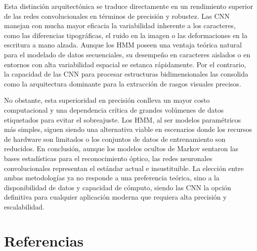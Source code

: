 \documentclass[
  spanish,
  us-letterpaper,
  DIV=11,
  numbers=noendperiod]{scrreprt}
\begin{document}
Esta distinción arquitectónica se traduce directamente en un rendimiento
superior de las redes convolucionales en términos de precisión y
robustez. Las CNN manejan con mucha mayor eficacia la variabilidad
inherente a los caracteres, como las diferencias tipográficas, el ruido
en la imagen o las deformaciones en la escritura a mano alzada. Aunque
los HMM poseen una ventaja teórica natural para el modelado de datos
secuenciales, su desempeño en caracteres aislados o en entornos con alta
variabilidad espacial se estanca rápidamente. Por el contrario, la
capacidad de las CNN para procesar estructuras bidimensionales las
consolida como la arquitectura dominante para la extracción de rasgos
visuales precisos.

No obstante, esta superioridad en precisión conlleva un mayor costo
computacional y una dependencia crítica de grandes volúmenes de datos
etiquetados para evitar el sobreajuste. Los HMM, al ser modelos
paramétricos más simples, siguen siendo una alternativa viable en
escenarios donde los recursos de hardware son limitados o los conjuntos
de datos de entrenamiento son reducidos. En conclusión, aunque los
modelos ocultos de Markov sentaron las bases estadísticas para el
reconocimiento óptico, las redes neuronales convolucionales representan
el estándar actual e insustituible. La elección entre ambas metodologías
ya no responde a una preferencia teórica, sino a la disponibilidad de
datos y capacidad de cómputo, siendo las CNN la opción definitiva para
cualquier aplicación moderna que requiera alta precisión y
escalabilidad.


\chapter{Referencias}\label{referencias}
\end{document}
